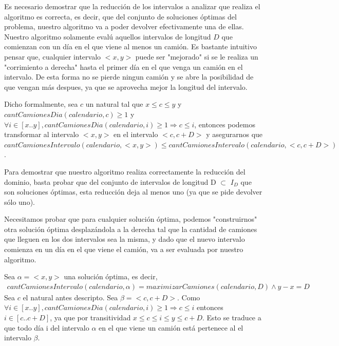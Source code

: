 Es necesario demostrar que la reducci\'on de los intervalos a analizar que realiza el algoritmo es correcta, es decir, que del conjunto de soluciones \'optimas del problema, nuestro algoritmo va a poder devolver efectivamente una de ellas. Nuestro algoritmo solamente eval\'u aquellos intervalos de longitud $D$ que comienzan con un d\'ia en el que viene al menos un cami\'on. Es bastante intuitivo pensar que, cualquier intervalo $<x,y>$ puede ser "mejorado" si se le realiza un "corrimiento a derecha" hasta el primer d\'ia en el que venga un cami\'on en el intervalo. De esta forma no se pierde ningun cami\'on y se abre la posibilidad de que vengan m\'as despues, ya que se aprovecha mejor la longitud del intervalo. 

\vspace{2mm}


Dicho formalmente, sea $c$ un natural tal que $ x \leq c \leq y$ y $cantCamionesDia(calendario, c) \geq 1$ y $\forall i \in [x..y], cantCamionesDia(calendario, i) \geq 1 \Rightarrow c \leq i $, entonces podemos transformar al intervalo $<x,y>$ en el intervalo $<c,c+D>$ y asegurarnos que $cantCamionesIntervalo(calendario, <x,y>) \leq  cantCamionesIntervalo(calendario, <c,c+D>)$.

\vspace{2mm}

Para demostrar que nuestro algoritmo realiza correctamente la reducci\'on del dominio, basta probar que del conjunto de intervalos de longitud D $\subset$ $I_D$ que son soluciones \'optimas, esta reducci\'on deja al menos uno (ya que se pide devolver s\'olo uno).

\vspace{2mm}

Necesitamos probar que para cualquier soluci\'on \'optima, podemos "construirnos" otra soluci\'on \'optima desplaz\'andola a la derecha tal que la cantidad de camiones que lleguen en los dos intervalos sea la misma, y dado que el nuevo intervalo comienza en un d\'ia en el que viene el cami\'on, va a ser evaluada por nuestro algoritmo.

Sea $\alpha = <x, y>$ una soluci\'on \'optima, es decir,
\begin{align*}
 cantCamionesIntervalo(calendario, \alpha) = maximizarCamiones(calendario, D) \land y - x = D
 \end{align*}
 Sea $c$ el natural antes descripto. Sea $\beta = <c, c+D>$. Como $\forall i \in [x..y], cantCamionesDia(calendario, i) \geq 1 \Rightarrow c \leq i $ entonces $i \in [c..c+D]$, ya que por transitividad  $x \leq c \leq i \leq y \leq c + D$. Esto se traduce a que todo d\'ia i del intervalo $\alpha$ en el que viene un cami\'on est\'a pertenece al el intervalo $\beta$. 

